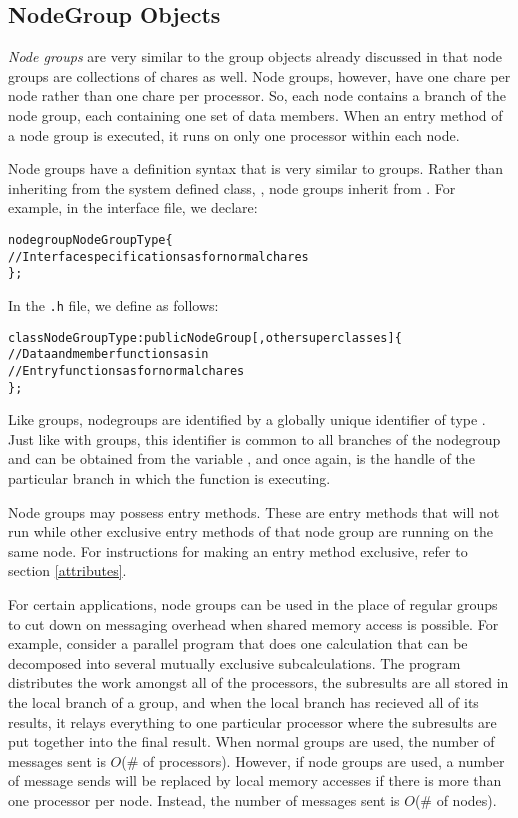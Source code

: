 \subsection{NodeGroup Objects}

{\it Node groups}    are very
similar to the group objects already discussed in that node groups are
collections of chares as well.  Node groups, however, have one chare per node
rather than one chare per processor.  So, each node contains a branch of the
node group, each containing one set of data members.  When an entry method of a
node group is executed, it runs on only one processor within each node.

Node groups have a definition syntax that is very similar to groups.  Rather
than inheriting from the system defined class, , node groups inherit
from .  For example, in the interface file, we declare:

\begin{alltt}
 nodegroup NodeGroupType \{
  // Interface specifications as for normal chares
 \};
\end{alltt}

In the {\tt .h} file, we define  as follows:

\begin{alltt}
 class NodeGroupType : public NodeGroup [,other superclasses ] \{
  // Data and member functions as in \CC{}
  // Entry functions as for normal chares
 \};
\end{alltt}

Like groups, nodegroups are identified by a globally unique identifier of type
.  Just like with groups, this identifier is
common to all branches of the nodegroup and can be obtained from the variable
, and once again, 
 is the handle of the particular branch in which the function is
executing.

Node groups may possess  entry methods.  These
are entry methods that will not run while other exclusive entry methods
of that node group are running on the same node.  For instructions for making
an entry method exclusive, refer to section \ref{attributes}.

For certain applications, node groups can be used in the place of regular
groups to cut down on messaging overhead when shared memory access is possible.
For example, consider a parallel program that does one calculation that can be
decomposed into several mutually exclusive subcalculations.  The program
distributes the work amongst all of the processors, the subresults are all
stored in the local branch of a group, and when the local branch has recieved
all of its results, it relays everything to one particular processor where the
subresults are put together into the final result.  When normal groups are
used, the number of messages sent is $O$(\# of processors).  However, if node
groups are used, a number of message sends will be replaced by local memory
accesses if there is more than one processor per node.  Instead, the number of
messages sent is $O$(\# of nodes).

